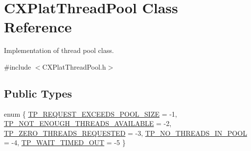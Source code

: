 \hypertarget{class_c_x_plat_thread_pool}{\section{\-C\-X\-Plat\-Thread\-Pool \-Class \-Reference}
\label{class_c_x_plat_thread_pool}
}


\-Implementation of thread pool class.  




{\ttfamily \#include $<$\-C\-X\-Plat\-Thread\-Pool.\-h$>$}

\subsection*{\-Public \-Types}
\begin{DoxyCompactItemize}
\item 
enum \{ \*
\hyperlink{class_c_x_plat_thread_pool_af9e53e586b75e48e1448f55a6111582ca8a5c9f7e63b6ac74a4a66b14bfe923ac}{\-T\-P\-\_\-\-R\-E\-Q\-U\-E\-S\-T\-\_\-\-E\-X\-C\-E\-E\-D\-S\-\_\-\-P\-O\-O\-L\-\_\-\-S\-I\-Z\-E} =  -\/1, 
\hyperlink{class_c_x_plat_thread_pool_af9e53e586b75e48e1448f55a6111582cac36cf7425db3e192dcdc16f9b544abd4}{\-T\-P\-\_\-\-N\-O\-T\-\_\-\-E\-N\-O\-U\-G\-H\-\_\-\-T\-H\-R\-E\-A\-D\-S\-\_\-\-A\-V\-A\-I\-L\-A\-B\-L\-E} =  -\/2, 
\hyperlink{class_c_x_plat_thread_pool_af9e53e586b75e48e1448f55a6111582ca80caa8215999d35921f9c8c826e2a359}{\-T\-P\-\_\-\-Z\-E\-R\-O\-\_\-\-T\-H\-R\-E\-A\-D\-S\-\_\-\-R\-E\-Q\-U\-E\-S\-T\-E\-D} =  -\/3, 
\hyperlink{class_c_x_plat_thread_pool_af9e53e586b75e48e1448f55a6111582ca82c08ff08aeed4dfea81c8f0081127d9}{\-T\-P\-\_\-\-N\-O\-\_\-\-T\-H\-R\-E\-A\-D\-S\-\_\-\-I\-N\-\_\-\-P\-O\-O\-L} =  -\/4, 
\*
\hyperlink{class_c_x_plat_thread_pool_af9e53e586b75e48e1448f55a6111582ca66f26b091aff25a6ce08d64301bd4ea8}{\-T\-P\-\_\-\-W\-A\-I\-T\-\_\-\-T\-I\-M\-E\-D\-\_\-\-O\-U\-T} =  -\/5
 \}
\end{DoxyCompactItemize}
